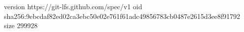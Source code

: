 version https://git-lfs.github.com/spec/v1
oid sha256:9ebcdaf82ed02ca3ebc50e02e761f61adc49856783cb0487e2615d3ee8f91792
size 299928

